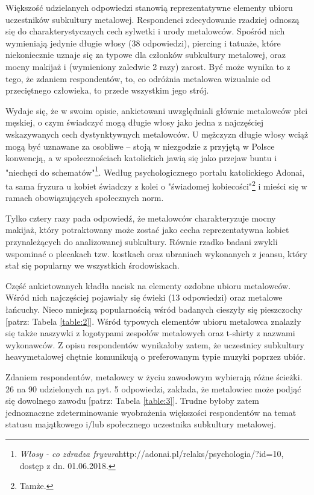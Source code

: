 \documentclass[12pt, a4paper, titlepage]{report}
\begin{document}
Większość udzielanych odpowiedzi stanowią reprezentatywne elementy ubioru uczestników subkultury metalowej. Respondenci zdecydowanie rzadziej odnoszą się do charakterystycznych cech sylwetki i urody metalowców. Spośród nich wymieniają jedynie długie włosy (38 odpowiedzi), piercing i tatuaże, które niekoniecznie uznaje się za typowe dla członków subkultury metalowej, oraz mocny makijaż i (wymieniony zaledwie 2 razy) zarost. Być może wynika to z tego, że zdaniem respondentów, to, co odróżnia metalowca wizualnie od przeciętnego człowieka, to przede wszystkim jego strój. 

Wydaje się, że w swoim opisie, ankietowani uwzględniali głównie metalowców płci męskiej, o czym świadczyć mogą długie włosy jako jedna z najczęściej wskazywanych cech dystynktywnych metalowców. U mężczyzn długie włosy wciąż mogą być uznawane za osobliwe -- stoją w niezgodzie z przyjętą w Polsce konwencją, a w społecznościach katolickich jawią się jako przejaw buntu i "niechęci do schematów"\footnote{\textit{Włosy - co zdradza fryzura}http://adonai.pl/relaks/psychologia/?id=10, dostęp z dn. 01.06.2018.}. Według psychologicznego portalu katolickiego Adonai, ta sama fryzura u kobiet świadczy z kolei o "świadomej kobiecości"\footnote{Tamże.} i mieści się w ramach obowiązujących społecznych norm. 

Tylko cztery razy pada odpowiedź, że metalowców charakteryzuje mocny makijaż, który potraktowany może zostać jako cecha reprezentatywna kobiet przynależących do analizowanej subkultury. Równie rzadko badani zwykli wspominać o plecakach tzw. kostkach oraz ubraniach wykonanych z jeansu, który stał się popularny we wszystkich środowiskach.

Część ankietowanych kładła nacisk na elementy ozdobne ubioru metalowców. Wśród nich najczęściej pojawiały się ćwieki (13 odpowiedzi) oraz metalowe łańcuchy. Nieco mniejszą popularnością wśród badanych cieszyły się pieszczochy [patrz: Tabela \ref{table:2}]. Wśród typowych elementów ubioru metalowca znalazły się także naszywki z logotypami zespołów metalowych oraz t-shirty z nazwami wykonawców. Z opisu respondentów wynikałoby zatem, że uczestnicy subkultury heavymetalowej chętnie komunikują o preferowanym typie muzyki poprzez ubiór. 

Zdaniem respondentów, metalowcy w życiu zawodowym wybierają różne ścieżki. 26 na 90 udzielonych na pyt. 5 odpowiedzi, zakłada, że metalowiec może podjąć się dowolnego zawodu [patrz: Tabela \ref{table:3}]. Trudne byłoby zatem jednoznaczne zdeterminowanie wyobrażenia większości respondentów na temat statusu majątkowego i/lub społecznego uczestnika subkultury metalowej. 
\end{document}
